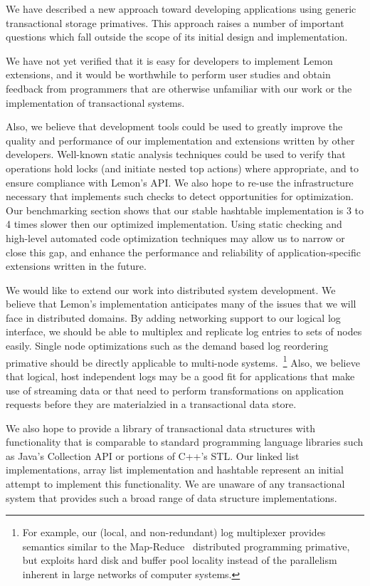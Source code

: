\documentclass[letterpaper,twocolumn,english]{article}
\newcommand{\yad}{Lemon\xspace}
\begin{document}
We have described a new approach toward developing applications using
generic transactional storage primatives.  This approach raises a
number of important questions which fall outside the scope of its
initial design and implementation.

We have not yet verified that it is easy for developers to implement
\yad extensions, and it would be worthwhile to perform user studies
and obtain feedback from programmers that are otherwise unfamiliar
with our work or the implementation of transactional systems.

Also, we believe that development tools could be used to greatly
improve the quality and performance of our implementation and
extensions written by other developers.  Well-known static analysis
techniques could be used to verify that operations hold locks (and
initiate nested top actions) where appropriate, and to ensure
compliance with \yad's API.  We also hope to re-use the infrastructure
necessary that implements such checks to detect opportunities for
optimization.  Our benchmarking section shows that our stable
hashtable implementation is 3 to 4 times slower then our optimized
implementation.  Using static checking and high-level automated code
optimization techniques may allow us to narrow or close this
gap, and enhance the performance and reliability of application-specific 
extensions written in the future.

We would like to extend our work into distributed system
development.  We believe that \yad's implementation anticipates many
of the issues that we will face in distributed domains.  By adding 
networking support to our logical log interface,
we should be able to multiplex and replicate log entries to sets of
nodes easily.  Single node optimizations such as the demand based log
reordering primative should be directly applicable to multi-node
systems.~\footnote{For example, our (local, and non-redundant) log
multiplexer provides semantics similar to the
Map-Reduce~\cite{mapReduce} distributed programming primative, but
exploits hard disk and buffer pool locality instead of the parallelism
inherent in large networks of computer systems.}  Also, we believe
that logical, host independent logs may be a good fit for applications
that make use of streaming data or that need to perform
transformations on application requests before they are materialzied
in a transactional data store.

We also hope to provide a library of
transactional data structures with functionality that is comparable to
standard programming language libraries such as Java's Collection API
or portions of C++'s STL.  Our linked list implementations, array list
implementation and hashtable represent an initial attempt to implement
this functionality.  We are unaware of any transactional system that
provides such a broad range of data structure implementations.  
\end{document}
